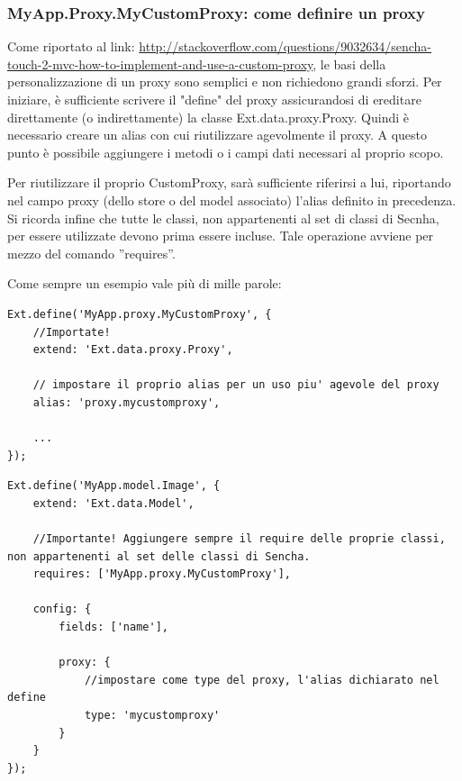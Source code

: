 \documentclass[10pt,a4paper,onecolumn]{article}
\begin{document}
\subsubsection{MyApp.Proxy.MyCustomProxy: come definire un proxy}

Come riportato al link: \url{http://stackoverflow.com/questions/9032634/sencha-touch-2-mvc-how-to-implement-and-use-a-custom-proxy}, le basi della personalizzazione di un proxy sono semplici e non richiedono grandi sforzi. Per iniziare, è sufficiente scrivere il "define" del proxy assicurandosi di ereditare direttamente (o indirettamente) la classe Ext.data.proxy.Proxy. Quindi è necessario creare un alias con cui riutilizzare agevolmente il proxy. A questo punto è possibile aggiungere i metodi o i campi dati necessari al proprio scopo.

Per riutilizzare il proprio CustomProxy, sarà sufficiente riferirsi a lui, riportando nel campo proxy (dello store o del model associato) l'alias definito in precedenza. Si ricorda infine che tutte le classi, non appartenenti al set di classi di Secnha, per essere utilizzate devono prima essere incluse. Tale operazione avviene per mezzo del comando ''requires''.

Come sempre un esempio vale più di mille parole:

\begin{lstlisting}
Ext.define('MyApp.proxy.MyCustomProxy', {
	//Importate!
    extend: 'Ext.data.proxy.Proxy',

    // impostare il proprio alias per un uso piu' agevole del proxy
    alias: 'proxy.mycustomproxy',

    ...
});
\end{lstlisting}

\begin{lstlisting}
Ext.define('MyApp.model.Image', {
    extend: 'Ext.data.Model',

    //Importante! Aggiungere sempre il require delle proprie classi, non appartenenti al set delle classi di Sencha.
    requires: ['MyApp.proxy.MyCustomProxy'],

    config: {
        fields: ['name'],

        proxy: {
            //impostare come type del proxy, l'alias dichiarato nel define
            type: 'mycustomproxy'
        }
    }
});
\end{lstlisting}
\end{document}
